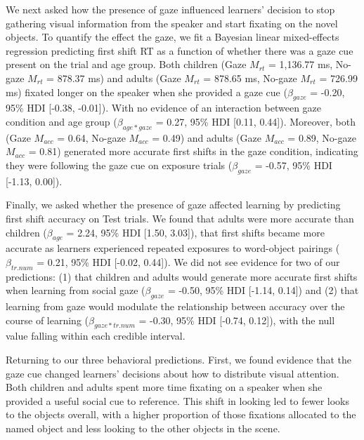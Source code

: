 \documentclass[man,floatsintext]{apa6}
\begin{document}
We next asked how the presence of gaze influenced learners' decision to
stop gathering visual information from the speaker and start fixating on
the novel objects. To quantify the effect the gaze, we fit a Bayesian
linear mixed-effects regression predicting first shift RT as a function
of whether there was a gaze cue present on the trial and age group. Both
children (Gaze \(M_{rt}\) = 1,136.77 ms, No-gaze \(M_{rt}\) = 878.37 ms)
and adults (Gaze \(M_{rt}\) = 878.65 ms, No-gaze \(M_{rt}\) = 726.99 ms)
fixated longer on the speaker when she provided a gaze cue
(\(\beta_{gaze}\) = -0.20, 95\% HDI {[}-0.38, -0.01{]}). With no
evidence of an interaction between gaze condition and age group
(\(\beta_{age*gaze}\) = 0.27, 95\% HDI {[}0.11, 0.44{]}). Moreover, both
(Gaze \(M_{acc}\) = 0.64, No-gaze \(M_{acc}\) = 0.49) and adults (Gaze
\(M_{acc}\) = 0.89, No-gaze \(M_{acc}\) = 0.81) generated more accurate
first shifts in the gaze condition, indicating they were following the
gaze cue on exposure trials (\(\beta_{gaze}\) = -0.57, 95\% HDI
{[}-1.13, 0.00{]}).

Finally, we asked whether the presence of gaze affected learning by
predicting first shift accuracy on Test trials. We found that adults
were more accurate than children (\(\beta_{age}\) = 2.24, 95\% HDI
{[}1.50, 3.03{]}), that first shifts became more accurate as learners
experienced repeated exposures to word-object pairings
(\(\beta_{tr.num}\) = 0.21, 95\% HDI {[}-0.02, 0.44{]}). We did not see
evidence for two of our predictions: (1) that children and adults would
generate more accurate first shifts when learning from social gaze
(\(\beta_{gaze}\) = -0.50, 95\% HDI {[}-1.14, 0.14{]}) and (2) that
learning from gaze would modulate the relationship between accuracy over
the course of learning (\(\beta_{gaze*tr.num}\) = -0.30, 95\% HDI
{[}-0.74, 0.12{]}), with the null value falling within each credible
interval.

Returning to our three behavioral predictions. First, we found evidence
that the gaze cue changed learners' decisions about how to distribute
visual attention. Both children and adults spent more time fixating on a
speaker when she provided a useful social cue to reference. This shift
in looking led to fewer looks to the objects overall, with a higher
proportion of those fixations allocated to the named object and less
looking to the other objects in the scene.
\end{document}
